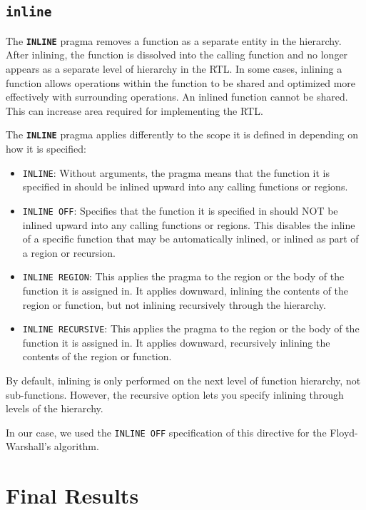 \subsection{\texttt{inline}}

The \texttt{\textbf{INLINE}} pragma removes a function as a separate entity in the hierarchy. After inlining, the function is dissolved into the calling function and no longer appears as a separate level of hierarchy in the RTL. In some cases, inlining a function allows operations within the function to be shared and optimized more effectively with surrounding operations. An inlined function cannot be shared. This can increase area required for implementing the RTL.

The \texttt{\textbf{INLINE}} pragma applies differently to the scope it is defined in depending on how it is specified:
\begin{itemize}
\item \texttt{INLINE}: Without arguments, the pragma means that the function it is specified in should be inlined upward into any calling functions or regions.
\item \texttt{INLINE OFF}: Specifies that the function it is specified in should NOT be inlined upward into any calling functions or regions. This disables the inline of a specific function that may be automatically inlined, or inlined as part of a region or recursion.
\item \texttt{INLINE REGION}: This applies the pragma to the region or the body of the function it is assigned in. It applies downward, inlining the contents of the region or function, but not inlining recursively through the hierarchy.
\item \texttt{INLINE RECURSIVE}: This applies the pragma to the region or the body of the function it is assigned in. It applies downward, recursively inlining the contents of the region or function.
\end{itemize}
By default, inlining is only performed on the next level of function hierarchy, not sub-functions. However, the recursive option lets you specify inlining through levels of the hierarchy.

In our case, we used the \texttt{INLINE OFF} specification of this directive for the Floyd-Warshall's algorithm.

\section{Final Results}

